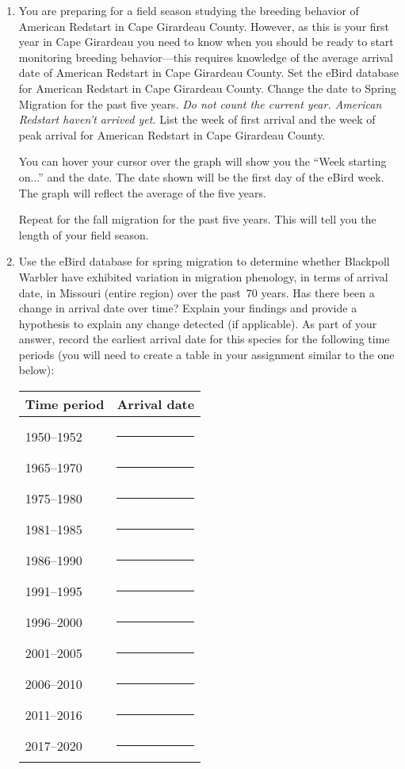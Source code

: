 \documentclass[12pt]{article}
\begin{document}
\begin{enumerate}
\item You are preparing for a field season studying the breeding behavior
of American Redstart in Cape Girardeau County. However, as this is your
first year in Cape Girardeau you need to know when you should be ready
to start monitoring breeding behavior---this requires knowledge of the
average arrival date of American Redstart in Cape Girardeau County. Set
the eBird database for American Redstart in Cape Girardeau County. Change the date to Spring Migration for the past five years. \emph{Do not count the current year. American Redstart haven't arrived yet.} List
the week of first arrival and the week of peak arrival for American Redstart in Cape Girardeau County.  

You can hover your cursor over the graph will show you the “Week starting on...” and the date. The date shown will be the first day of the eBird week. The graph will reflect the average of the five years.

Repeat for the fall migration for the past five years. This will tell you the length of your field season.


\item Use the eBird database for spring migration to determine
whether Blackpoll Warbler have exhibited variation in migration
phenology, in terms of arrival date, in Missouri (entire region) over the past~70 years.
Has there been a change in arrival date over time? Explain your findings
and provide a hypothesis to explain any change detected (if applicable).
As part of your answer, record the earliest arrival date for this
species for the following time periods (you will need to create a table
in your assignment similar to the one below):

\begin{longtable}[]{@{}ll@{}}
\toprule
Time period & Arrival date\tabularnewline
\midrule
\endhead
& \tabularnewline[-6pt]
1950–1952 & \rule{2cm}{0.4pt}\tabularnewline[0.5em]
1965–1970 & \rule{2cm}{0.4pt}\tabularnewline[0.5em]
1975–1980 & \rule{2cm}{0.4pt}\tabularnewline[0.5em]
1981–1985 & \rule{2cm}{0.4pt}\tabularnewline[0.5em]
1986–1990 & \rule{2cm}{0.4pt}\tabularnewline[0.5em]
1991–1995 & \rule{2cm}{0.4pt}\tabularnewline[0.5em]
1996–2000 & \rule{2cm}{0.4pt}\tabularnewline[0.5em]
2001–2005 & \rule{2cm}{0.4pt}\tabularnewline[0.5em]
2006–2010 & \rule{2cm}{0.4pt}\tabularnewline[0.5em]
2011–2016 & \rule{2cm}{0.4pt}\tabularnewline[0.5em]
2017–2020 & \rule{2cm}{0.4pt}\tabularnewline
\bottomrule
\end{longtable}


\end{enumerate}
\end{document}
